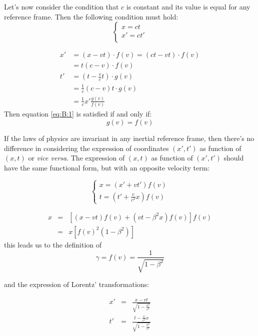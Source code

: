 Let's now consider the condition that $c$ is constant and its value is equal for any reference frame. Then the following condition must hold:
\begin{equation}
\label{eq:B:1}
  \begin{cases}
    x = ct\\
    x'=ct'\\
  \end{cases}
\end{equation}

\begin{eqnarray*}
  x' &= (x-vt)\cdot f(v) = (ct-vt)\cdot f(v)\\
  &= t(c-v)\cdot f(v)\\
  t' &= \left(t-\frac{v}{c}t\right)\cdot g(v)\\
  &= \frac{1}{c} (c-v) t \cdot g(v)\\
  &= \frac{1}{c} x' \frac{g(v)}{f(v)}
\end{eqnarray*}
Then equation \ref{eq:B:1} is satisfied if and only if:
\[g(v) = f(v)\]

If the laws of physics are invariant in any inertial reference frame, then there's no difference in considering the expression of coordinates $(x',t')$ as function of $(x,t)$ or \emph{vice versa}. The expression of $(x,t)$ as function of $(x',t')$ should have the same functional form, but with an opposite velocity term:

\begin{equation}
  \begin{cases}
    x = (x'+vt')f(v)\\
    t = \left(t' + \frac{v}{c^2}x\right)f(v)
    \end{cases}
\end{equation}

\begin{eqnarray*}
  x &=& \left[ \left( x-vt\right)f(v)+\left(vt-\beta^2x\right)f(v)\right]f(v)\\
  &=& x\left[f(v)^2\left(1-\beta^2\right)\right]
\end{eqnarray*}
this leads us to the definition of
\begin{equation}
  \label{eq:gamma}
\gamma = f(v) = \frac{1}{\sqrt{1-\beta^2}}
\end{equation}

and the expression of Lorentz' transformations:

\begin{eqnarray}
  x' &=& \frac{x-vt}{\sqrt{1-\frac{v^2}{c^2}}}\\
  t' &=& \frac{t-\frac{v}{c^2}x}{\sqrt{1-\frac{v^2}{c^2}}}\\
\end{eqnarray}


